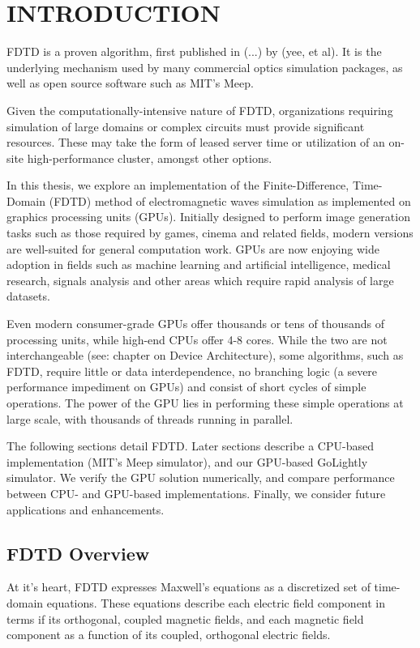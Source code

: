 \chapter{INTRODUCTION} \label{ch:introduction}

FDTD \cite{Yee} is a proven algorithm, first published in (...) by (yee, et al). It is the underlying mechanism used by many commercial optics simulation packages, as well as open source software such as MIT's Meep. 

Given the computationally-intensive nature of FDTD, organizations requiring simulation of large domains or complex circuits must provide significant resources. These may take the form of leased server time or utilization of an on-site high-performance cluster, amongst other options.

In this thesis, we explore an implementation of the Finite-Difference, Time-Domain (FDTD) method of electromagnetic waves simulation as implemented on graphics processing units (GPUs). Initially designed to perform image generation tasks such as those required by games, cinema and related fields, modern versions are well-suited for general computation work. GPUs are now enjoying wide adoption in fields such as machine learning and artificial intelligence, medical research, signals analysis and other areas which require rapid analysis of large datasets.

Even modern consumer-grade GPUs offer thousands or tens of thousands of processing units, while high-end CPUs offer 4-8 cores. While the two are not interchangeable (see: chapter on Device Architecture), some algorithms, such as FDTD, require little or data interdependence, no branching logic (a severe performance impediment on GPUs) and consist of short cycles of simple operations. The power of the GPU lies in performing these simple operations at large scale, with thousands of threads running in parallel. 

The following sections detail FDTD. Later sections describe a CPU-based implementation (MIT's  Meep simulator), and our GPU-based GoLightly simulator. We verify the GPU solution numerically, and compare performance between CPU- and GPU-based implementations. Finally, we consider future applications and enhancements. 


\section{FDTD Overview}

At it's heart, FDTD expresses Maxwell's equations as a discretized set of time-domain equations. These equations describe each electric field component in terms if its orthogonal, coupled magnetic fields, and each magnetic field component as a function of its coupled, orthogonal electric fields.


